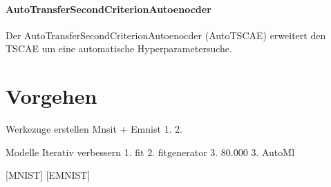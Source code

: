  	\paragraph{AutoTransferSecondCriterionAutoenocder} Der AutoTransferSecondCriterionAutoenocder (AutoTSCAE) erweitert den TSCAE um eine automatische Hyperparametersuche. 
  		
	\section{Vorgehen}
	\label{sec:Vorgehen}
	Werkezuge erstellen Mnsit + Emnist
	 1.
	 2.
	 
	Modelle Iterativ verbessern
		1. fit
		2. fitgenerator
		3. 80.000	
	3. AutoMl
		
	
	
	[MNIST] [EMNIST]
	




